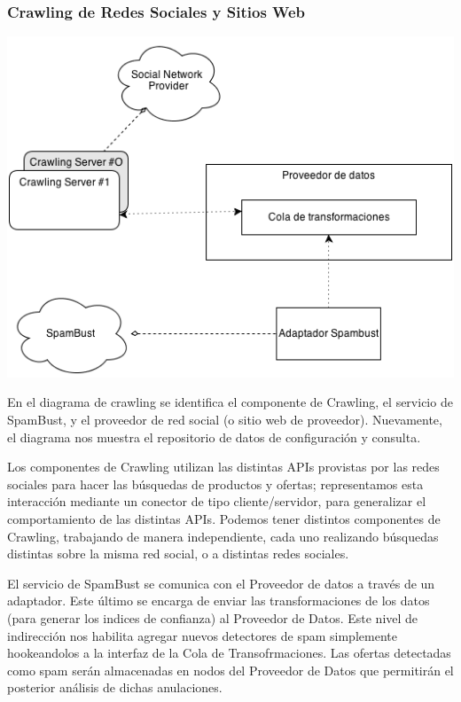 \subsubsection*{Crawling de Redes Sociales y Sitios Web}

\includegraphics[scale=0.5]{ISW2_cNc_Crawling}

En el diagrama de crawling se identifica el componente de Crawling, el servicio de SpamBust, y el proveedor de red social (o sitio web de proveedor). Nuevamente, el diagrama nos muestra el repositorio de datos de configuraci\'on y consulta.

Los componentes de Crawling utilizan las distintas APIs provistas por las redes sociales para hacer las b\'usquedas de productos y ofertas; representamos esta interacci\'on mediante un conector de tipo cliente/servidor, para generalizar el comportamiento de las distintas APIs. Podemos tener distintos componentes de Crawling, trabajando de manera independiente, cada uno realizando b\'usquedas distintas sobre la misma red social, o a distintas redes sociales.

El servicio de SpamBust se comunica con el Proveedor de datos a trav\'es de un adaptador. Este \'ultimo se encarga de enviar las transformaciones de los datos (para generar los indices de confianza) al Proveedor de Datos. Este nivel de indirecci\'on nos habilita agregar nuevos detectores de spam simplemente hookeandolos a la interfaz de la Cola de Transofrmaciones. Las ofertas detectadas como spam ser\'an almacenadas en nodos del Proveedor de Datos que permitir\'an el posterior an\'alisis de dichas anulaciones.

